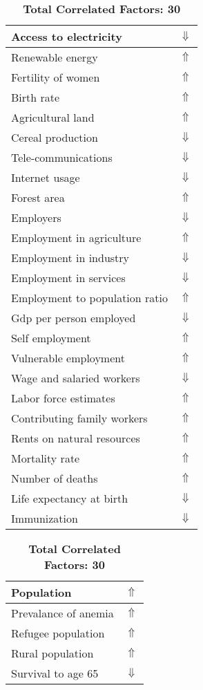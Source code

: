 \documentclass[12pt,notitlepage,oneside]{report}
\begin{document}
\begin{table}[!htb]
\caption{\textbf{Is Carried By: Squirrel $\Uparrow$}}
\centering
\label{Correlated Socio-economic Factors0}
\begin{tabular}{|l|l|}
\hline
Access to electricity & $\Downarrow$\\ \hline
Renewable energy & $\Uparrow$\\ \hline
Fertility of women & $\Uparrow$\\ \hline
Birth rate & $\Uparrow$\\ \hline
Agricultural land & $\Uparrow$\\ \hline
Cereal production & $\Downarrow$\\ \hline
Tele-communications & $\Downarrow$\\ \hline
Internet usage & $\Downarrow$\\ \hline
Forest area & $\Uparrow$\\ \hline
Employers & $\Downarrow$\\ \hline
Employment in agriculture & $\Uparrow$\\ \hline
Employment in industry & $\Downarrow$\\ \hline
Employment in services & $\Downarrow$\\ \hline
Employment to population ratio & $\Uparrow$\\ \hline
Gdp per person employed & $\Downarrow$\\ \hline
Self employment & $\Uparrow$\\ \hline
Vulnerable employment & $\Uparrow$\\ \hline
Wage and salaried workers & $\Downarrow$\\ \hline
Labor force estimates & $\Uparrow$\\ \hline
Contributing family workers & $\Uparrow$\\ \hline
Rents on natural resources & $\Uparrow$\\ \hline
Mortality rate & $\Uparrow$\\ \hline
Number of deaths & $\Uparrow$\\ \hline
Life expectancy at birth & $\Downarrow$\\ \hline
Immunization & $\Downarrow$\\ \hline
\end{tabular}
\begin{tabular}{|l|l|}
\hline
Population & $\Uparrow$\\ \hline
Prevalance of anemia & $\Uparrow$\\ \hline
Refugee population & $\Uparrow$\\ \hline
Rural population & $\Uparrow$\\ \hline
Survival to age 65 & $\Downarrow$\\ \hline
\end{tabular}
\caption*{\textbf{Total Correlated Factors: 30}}
\end{table}
\end{document}
